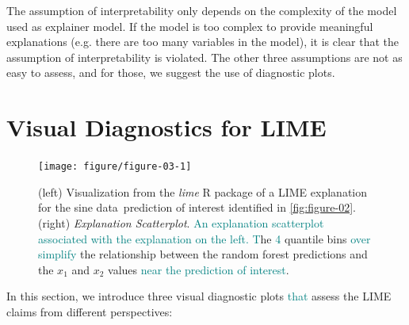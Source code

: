 \documentclass[AMS,STIX2COL]{WileyNJD-v2}\usepackage[]{graphicx}\usepackage[]{color}
\newenvironment{knitrout}{}{} %
\newcommand{\kge}[1]{\textcolor{teal}{#1}}
\newcommand{\data}{sine data}
\renewcommand{\sout}[1]{\unskip}
\begin{document}
The assumption of interpretability only depends on the complexity of the model used as explainer model. If the model is too complex to provide meaningful explanations (e.g. there are too many variables in the model), it is clear that the assumption of interpretability is violated. The other three assumptions are not as easy to assess, and for those, we suggest the use of diagnostic plots.

\section{Visual Diagnostics for LIME} \label{diagnostics}







\begin{figure}[!thp]
\begin{knitrout}
\color{fgcolor}

{\centering \texttt{[image: figure/figure-03-1]} 

}



\end{knitrout}
\caption{(left) Visualization from the \emph{lime} R package of a LIME explanation for the \data \ prediction of interest identified in \autoref{fig:figure-02}. (right) \emph{Explanation Scatterplot}. \sout{The points represent the simulated data colored by the random forest probabilities and sized by the assigned LIME weights. The prediction of interest is shown as the diamond shaped point. The explainer model indicator variables associated with $x_1$ and $x_2$ (quantile bins containing the prediction of interest) are depicted by the solid lines. The line colors represent the explainer model coefficient signs and indicate whether the feature supports a prediction of `blue' (blue lines) or supports a prediction of `red' (red lines).} \kge{An explanation scatterplot associated with the explanation \sout{for the prediction of interest depicted} on the left.} \sout{This figure shows that t}\kge{T}he \kge{4} quantile bins \kge{over simplify} \sout{are not flexible enough to capture}
the relationship between the random forest predictions and the $x_1$ and $x_2$ values \kge{near the prediction of interest}.}
\label{fig:figure-03}
\end{figure}

In this section, we introduce three visual diagnostic plots \sout{for the assessment of LIME. The plots focus on different levels of application of LIME (e.g. on explanation versus a set of explanations) to} \kge{that} assess the LIME claims from different perspectives:
\end{document}
